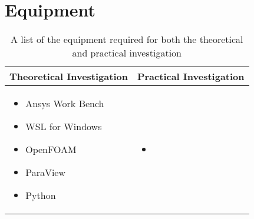 \section{Equipment}
\begin{table}[H]
	\centering
	\renewcommand{\arraystretch}{1.3}
	\begin{tabularx}{\textwidth}{|X|X|}
		\hline
		\textbf{Theoretical Investigation} & \textbf{Practical Investigation} \\
		\hline
		\begin{itemize}[leftmargin=1.5em, itemsep=2pt, topsep=0pt, label=--]
			\item Ansys Work Bench \parencite{noauthor_ansys_nodate}
			\item WSL for Windows \parencite{noauthor_windows_nodate}
			\item OpenFOAM \parencite{noauthor_openfoam_2024}
			\item ParaView \parencite{noauthor_paraview_nodate}
			\item Python \parencite{noauthor_python_2025}
		\end{itemize} 
		&
		\begin{itemize}[leftmargin=1.5em, itemsep=2pt, topsep=0pt, label=--]
			\item 
		\end{itemize} \\
		\hline
	\end{tabularx}
	\caption{A list of the equipment required for both the theoretical and practical investigation}
	\label{tab:equipmentList}
\end{table}

